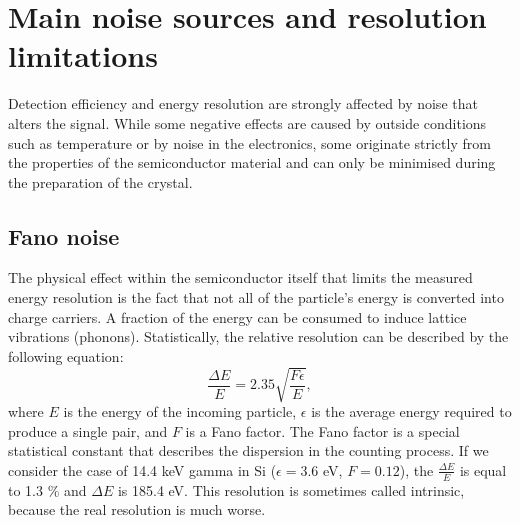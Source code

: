 \section{Main noise sources and resolution limitations}
Detection efficiency and energy resolution are strongly affected by noise that alters the signal. While some negative effects are caused by outside conditions such as temperature or by noise in the electronics, some originate strictly from the properties of the semiconductor material and can only be minimised during the preparation of the crystal.

\subsection{Fano noise}
The physical effect within the semiconductor itself that limits the measured energy resolution is the fact that not all of the particle's energy is converted into charge carriers. A fraction of the energy can be consumed to induce lattice vibrations (phonons). Statistically, the relative resolution can be described by the following equation:
\begin{equation}
\frac{\Delta E}{E} = 2.35\sqrt{\frac{F\epsilon}{E}},
\end{equation}
where $E$ is the energy of the incoming particle, $\epsilon$ is the average energy required to produce a single pair, and $F$ is a Fano factor. The Fano factor is a special statistical constant that describes the dispersion in the counting process. If we consider the case of 14.4 keV gamma in Si ($\epsilon = 3.6$ eV, $F = 0.12$), the $\frac{\Delta E}{E}$ is equal to 1.3 $\%$ and $\Delta E$ is 185.4 eV. This resolution is sometimes called intrinsic, because the real resolution is much worse.




